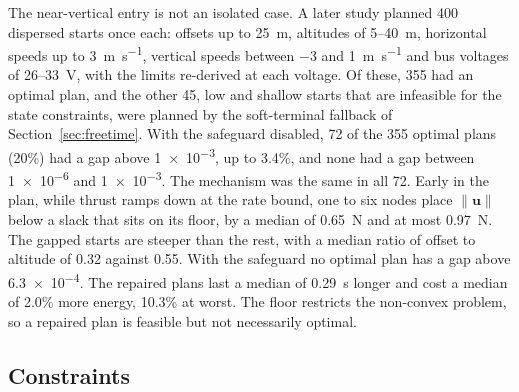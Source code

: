 \documentclass[journal]{IEEEtran}
\newcommand{\refsec}[1]{Section~\ref{#1}}
\newcommand{\vect}[1]{\bm{#1}}
\begin{document}
The near-vertical entry is not an isolated case.
A later study planned 400 dispersed starts once each: offsets up to \SI{25}{\metre}, altitudes of 5--\SI{40}{\metre}, horizontal speeds up to \SI{3}{\metre\per\second}, vertical speeds between \SI{-3}{} and \SI{+1}{\metre\per\second} and bus voltages of 26--\SI{33}{\volt}, with the limits re-derived at each voltage.
Of these, 355 had an optimal plan, and the other 45, low and shallow starts that are infeasible for the state constraints, were planned by the soft-terminal fallback of \refsec{sec:freetime}.
With the safeguard disabled, 72 of the 355 optimal plans (20\%) had a gap above \num{1e-3}, up to 3.4\%, and none had a gap between \num{1e-6} and \num{1e-3}.
The mechanism was the same in all 72.
Early in the plan, while thrust ramps down at the rate bound, one to six nodes place $\|\vect{u}\|$ below a slack that sits on its floor, by a median of \SI{0.65}{\newton} and at most \SI{0.97}{\newton}.
The gapped starts are steeper than the rest, with a median ratio of offset to altitude of 0.32 against 0.55.
With the safeguard no optimal plan has a gap above \num{6.3e-4}.
The repaired plans last a median of \SI{0.29}{\second} longer and cost a median of 2.0\% more energy, 10.3\% at worst.
The floor restricts the non-convex problem, so a repaired plan is feasible but not necessarily optimal.

\subsection{Constraints}
\label{sec:constraints}
\end{document}

